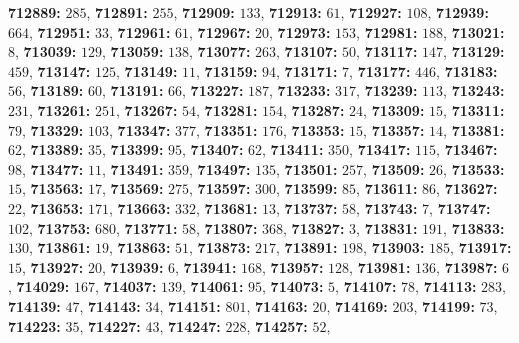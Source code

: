\textsf{\bfseries 712889:} $285$, \textsf{\bfseries 712891:} $255$, \textsf{\bfseries 712909:} $133$, \textsf{\bfseries 712913:} $61$, \textsf{\bfseries 712927:} $108$, \textsf{\bfseries 712939:} $664$, \textsf{\bfseries 712951:} $33$, \textsf{\bfseries 712961:} $61$, \textsf{\bfseries 712967:} $20$, \textsf{\bfseries 712973:} $153$, \textsf{\bfseries 712981:} $188$, \textsf{\bfseries 713021:} $8$, \textsf{\bfseries 713039:} $129$, \textsf{\bfseries 713059:} $138$, \textsf{\bfseries 713077:} $263$, \textsf{\bfseries 713107:} $50$, \textsf{\bfseries 713117:} $147$, \textsf{\bfseries 713129:} $459$, \textsf{\bfseries 713147:} $125$, \textsf{\bfseries 713149:} $11$, \textsf{\bfseries 713159:} $94$, \textsf{\bfseries 713171:} $7$, \textsf{\bfseries 713177:} $446$, \textsf{\bfseries 713183:} $56$, \textsf{\bfseries 713189:} $60$, \textsf{\bfseries 713191:} $66$, \textsf{\bfseries 713227:} $187$, \textsf{\bfseries 713233:} $317$, \textsf{\bfseries 713239:} $113$, \textsf{\bfseries 713243:} $231$, \textsf{\bfseries 713261:} $251$, \textsf{\bfseries 713267:} $54$, \textsf{\bfseries 713281:} $154$, \textsf{\bfseries 713287:} $24$, \textsf{\bfseries 713309:} $15$, \textsf{\bfseries 713311:} $79$, \textsf{\bfseries 713329:} $103$, \textsf{\bfseries 713347:} $377$, \textsf{\bfseries 713351:} $176$, \textsf{\bfseries 713353:} $15$, \textsf{\bfseries 713357:} $14$, \textsf{\bfseries 713381:} $62$, \textsf{\bfseries 713389:} $35$, \textsf{\bfseries 713399:} $95$, \textsf{\bfseries 713407:} $62$, \textsf{\bfseries 713411:} $350$, \textsf{\bfseries 713417:} $115$, \textsf{\bfseries 713467:} $98$, \textsf{\bfseries 713477:} $11$, \textsf{\bfseries 713491:} $359$, \textsf{\bfseries 713497:} $135$, \textsf{\bfseries 713501:} $257$, \textsf{\bfseries 713509:} $26$, \textsf{\bfseries 713533:} $15$, \textsf{\bfseries 713563:} $17$, \textsf{\bfseries 713569:} $275$, \textsf{\bfseries 713597:} $300$, \textsf{\bfseries 713599:} $85$, \textsf{\bfseries 713611:} $86$, \textsf{\bfseries 713627:} $22$, \textsf{\bfseries 713653:} $171$, \textsf{\bfseries 713663:} $332$, \textsf{\bfseries 713681:} $13$, \textsf{\bfseries 713737:} $58$, \textsf{\bfseries 713743:} $7$, \textsf{\bfseries 713747:} $102$, \textsf{\bfseries 713753:} $680$, \textsf{\bfseries 713771:} $58$, \textsf{\bfseries 713807:} $368$, \textsf{\bfseries 713827:} $3$, \textsf{\bfseries 713831:} $191$, \textsf{\bfseries 713833:} $130$, \textsf{\bfseries 713861:} $19$, \textsf{\bfseries 713863:} $51$, \textsf{\bfseries 713873:} $217$, \textsf{\bfseries 713891:} $198$, \textsf{\bfseries 713903:} $185$, \textsf{\bfseries 713917:} $15$, \textsf{\bfseries 713927:} $20$, \textsf{\bfseries 713939:} $6$, \textsf{\bfseries 713941:} $168$, \textsf{\bfseries 713957:} $128$, \textsf{\bfseries 713981:} $136$, \textsf{\bfseries 713987:} $6$, \textsf{\bfseries 714029:} $167$, \textsf{\bfseries 714037:} $139$, \textsf{\bfseries 714061:} $95$, \textsf{\bfseries 714073:} $5$, \textsf{\bfseries 714107:} $78$, \textsf{\bfseries 714113:} $283$, \textsf{\bfseries 714139:} $47$, \textsf{\bfseries 714143:} $34$, \textsf{\bfseries 714151:} $801$, \textsf{\bfseries 714163:} $20$, \textsf{\bfseries 714169:} $203$, \textsf{\bfseries 714199:} $73$, \textsf{\bfseries 714223:} $35$, \textsf{\bfseries 714227:} $43$, \textsf{\bfseries 714247:} $228$, \textsf{\bfseries 714257:} $52$, 
